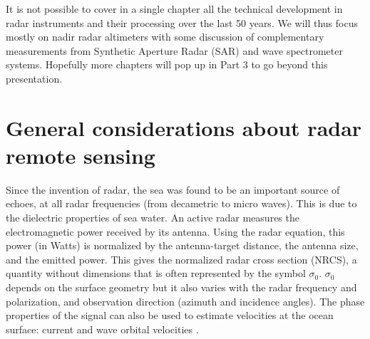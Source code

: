 
It is not possible to cover in a single chapter all the technical development in radar instruments and their processing over the last 50 years. We will thus focus mostly on nadir radar altimeters with some discussion of complementary measurements from Synthetic Aperture Radar (SAR) and wave spectrometer systems. Hopefully more chapters will pop up in Part 3 to go beyond 
this presentation. 

\section{General considerations about radar remote sensing}
Since the invention of radar, the sea was found to be an important source of echoes, at all radar frequencies (from decametric to micro waves). 
This is due to the dielectric properties of sea water. An active radar measures the electromagnetic power received by its antenna. Using the radar equation, this power (in Watts)
is normalized by the antenna-target distance, the antenna size, and the emitted power. This gives the normalized radar cross section (NRCS), a quantity without dimensions that is often represented 
by the symbol $\sigma_0$. 
$\sigma_0$ depends on the surface geometry but it also varies with the radar frequency and polarization,  and observation direction (azimuth and incidence angles). %
The phase properties of the signal can also be used to estimate velocities at the ocean surface: current and wave orbital velocities \citep{Nouguier&al.2018,Rodriguez2018}. 

